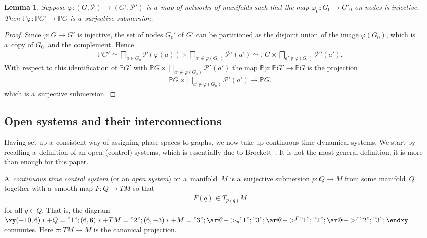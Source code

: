\documentclass[10pt,a4paper]{amsart}
\numberwithin{equation}{section}
\newtheorem{Lemma}[Theorem]{Lemma}
\begin{document}
\begin{Lemma}
\label{lemma:2.inj}
Suppose $\varphi\colon (G,{\mathcal P})\to (G',{\mathcal P}')$ is a~map of networks of manifolds such that the map
$\varphi_0\colon G_0 \to G'_0$ on nodes is injective.
Then $\mathbb{P}\varphi\colon \mathbb{P} G'\to \mathbb{P} G$ is a~surjective submersion.
\end{Lemma}
\begin{proof}
Since $\varphi\colon G\to G'$ is injective, the set of nodes $G_0'$ of $G'$ can be partitioned as the disjoint union of
the image $\varphi(G_0)$, which is a~copy of $G_0$, and the complement.
Hence
\begin{gather*}
\mathbb{P} G' \simeq \bigsqcap_{a\in G_0} {\mathcal P}(\varphi(a)) \times \bigsqcap_{a'\not\in \varphi(G_0)} {\mathcal
P}' (a') \simeq \mathbb{P} G \times \bigsqcap_{a'\not\in \varphi(G_0)} {\mathcal P}' (a').
\end{gather*}
With respect to this identif\/ication of $\mathbb{P} G'$ with $\mathbb{P} G \times \bigsqcap\limits_{a'\not\in \varphi(G_0)}
{\mathcal P}' (a')$ the map $\mathbb{P}\varphi\colon \mathbb{P} G'\to \mathbb{P} G$ is the projection
\begin{gather*}
\mathbb{P} G \times \bigsqcap_{a'\not\in \varphi(G_0)} {\mathcal P}' (a') \to \mathbb{P} G.
\end{gather*}
which is a~surjective submersion.
\end{proof}

\subsection{Open systems and their interconnections}

\noindent Having set up a~consistent way of assigning phase spaces to graphs, we now take up continuous time dynamical
systems.
We start by recalling a~def\/inition of an open (control) systems, which is essentially due to Brockett~\cite{Brockett}.
It is not the most general def\/inition; it is more than enough for this paper.

\begin{Definition}
\label{def:open-sys}
A~{\it continuous time control system} (or an {\it open system}) on a~manifold~$M$ is a~surjective submersion $p\colon
Q\to M$ from some manifold~$Q$ together with a~smooth map $ F\colon Q \to TM$ so that
\begin{gather*}
F(q) \in T_{p(q)} M
\end{gather*}
for all $q\in Q $.
That is, the diagram $
\xy (-10, 6)*+{Q}="1";
(6, 6)*+{TM} ="2";
(6,-3)*+{M}="3";
{\ar@{->}_{ p}  "1";"3"};
{\ar@{->}^{F} "1";"2"};
{\ar@{->}^{\pi} "2";"3"}; \endxy
$ commutes.
Here $\pi\colon TM \to M$ is the canonical projection.
\end{Definition}
\end{document}
